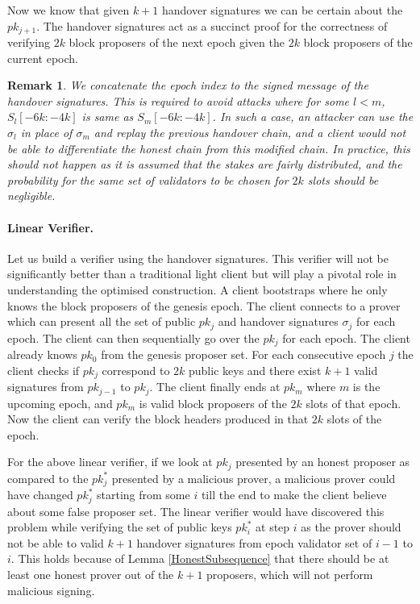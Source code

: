 \documentclass[a4paper,11pt,oneside]{article}
\newtheorem*{remark}{Remark}
\theoremstyle{definition}
\begin{document}
  Now we know that given $k + 1$ handover signatures we can be certain about the $pk_{j + 1}$. The handover signatures act as a succinct proof for the correctness of verifying $2k$ block proposers of the next epoch given the $2k$ block proposers of the current epoch.
  
  \begin{remark}
  We concatenate the epoch index to the signed message of the handover signatures. This is required to avoid attacks where for some $l < m$, $S_l[-6k:-4k]$ is same as $S_m[-6k:-4k]$. In such a case, an attacker can use the $\sigma_l$ in place of $\sigma_m$ and replay the previous handover chain, and a client would not be able to differentiate the honest chain from this modified chain. In practice, this should not happen as it is assumed that the stakes are fairly distributed, and the probability for the same set of validators to be chosen for $2k$ slots should be negligible. 
  \end{remark}
 
  \paragraph{Linear Verifier.} Let us build a verifier using the handover signatures. This verifier will not be significantly better than a traditional light client but will play a pivotal role in understanding the optimised construction. A client bootstraps where he only knows the block proposers of the genesis epoch. The client connects to a prover which can present all the set of public $pk_j$ and handover signatures ${\sigma}_j$ for each epoch. The client can then sequentially go over the $pk_j$ for each epoch. The client already knows $pk_0$ from the genesis proposer set. For each consecutive epoch $j$ the client checks if $pk_j$ correspond to $2k$ public keys and there exist $k + 1$ valid signatures from $pk_{j - 1}$ to $pk_{j}$. The client finally ends at $pk_m$ where $m$ is the upcoming epoch, and $pk_m$ is valid block proposers of the $2k$ slots of that epoch. Now the client can verify the block headers produced in that $2k$ slots of the epoch. 
  
  For the above linear verifier, if we look at $pk_j$ presented by an honest proposer as compared to the $pk^{*}_{j}$ presented by a malicious prover, a malicious prover could have changed $pk^{*}_{j}$ starting from some $i$ till the end to make the client believe about some false proposer set. The linear verifier would have discovered this problem while verifying the set of public keys $pk^*_i$ at step $i$ as the prover should not be able to valid $k + 1$ handover signatures from epoch validator set of $i - 1$ to $i$. This holds because of Lemma \ref{HonestSubsequence} that there should be at least one honest prover out of the $k + 1$ proposers, which will not perform malicious signing.   
  
\end{document}
